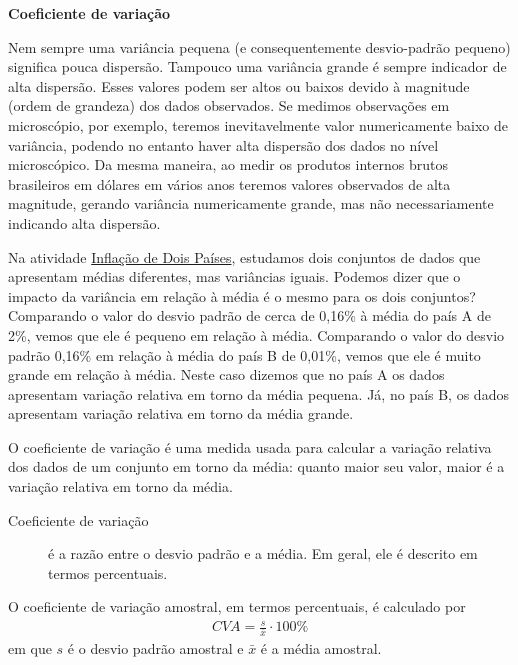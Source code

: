 {{{\textbf{Coeficiente de variação}

Nem sempre uma variância pequena (e consequentemente desvio-padrão pequeno) significa pouca dispersão. Tampouco uma variância grande é sempre indicador de alta dispersão. Esses valores podem ser altos ou baixos devido à magnitude (ordem de grandeza) dos dados observados. Se medimos observações em microscópio, por exemplo, teremos inevitavelmente valor numericamente baixo de variância, podendo no entanto haver alta dispersão dos dados no nível microscópico. Da mesma maneira, ao medir os produtos internos brutos brasileiros em dólares em vários anos teremos valores observados de alta magnitude, gerando variância numericamente grande, mas não necessariamente indicando alta dispersão.

Na atividade \hyperref[\detokenize{PE104-4:ativ-inflacao-anual}]{Inflação de Dois Países}, estudamos dois conjuntos de dados que apresentam médias diferentes, mas variâncias iguais. Podemos dizer que o impacto da variância em relação à média é o mesmo para os dois conjuntos? Comparando o valor do desvio padrão de cerca de 0,16\% à média do país A de 2\%, vemos que ele é pequeno em relação à média. Comparando o valor do desvio padrão 0,16\% em relação à média do país B de 0,01\%, vemos que ele é muito grande em relação à média. Neste caso dizemos que no país A os dados apresentam variação relativa em torno da média pequena. Já, no país B, os dados apresentam variação relativa em torno da média grande.

O coeficiente de variação é uma medida usada para calcular a variação relativa dos dados de um conjunto em torno da média: quanto maior seu valor, maior é a variação relativa em torno da média.
\begin{description}
\item[{Coeficiente de variação}] \leavevmode{}\label{\detokenize{PE104-4:term-coeficiente-de-variacao}}
é a razão entre o desvio padrão e a média. Em geral, ele é descrito em termos percentuais.

\end{description}

O coeficiente de variação amostral, em termos percentuais, é calculado  por
\begin{equation*}
\begin{split}CVA=\frac{s}{\bar{x}}\cdot 100 \%\end{split}
\end{equation*}
em que \(s\) é o desvio padrão amostral e \(\bar{x}\) é a média amostral.

}}}
